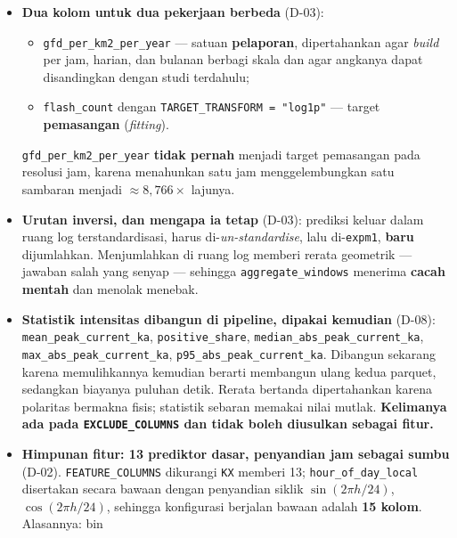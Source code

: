 \begin{itemize}
    \item \textbf{Dua kolom untuk dua pekerjaan berbeda} (D-03):
          \begin{itemize}
              \item \texttt{gfd\_per\_km2\_per\_year} --- satuan
                    \textbf{pelaporan}, dipertahankan agar \textit{build} per
                    jam, harian, dan bulanan berbagi skala dan agar angkanya
                    dapat disandingkan dengan studi terdahulu;
              \item \texttt{flash\_count} dengan
                    \texttt{TARGET\_TRANSFORM = "log1p"} --- target
                    \textbf{pemasangan} (\textit{fitting}).
          \end{itemize}
          \texttt{gfd\_per\_km2\_per\_year} \textbf{tidak pernah} menjadi target
          pemasangan pada resolusi jam, karena menahunkan satu jam menggelembungkan
          satu sambaran menjadi $\approx 8{,}766\times$ lajunya.
    \item \textbf{Urutan inversi, dan mengapa ia tetap} (D-03): prediksi keluar
          dalam ruang log terstandardisasi, harus di-\textit{un-standardise},
          lalu di-\texttt{expm1}, \textbf{baru} dijumlahkan. Menjumlahkan di
          ruang log memberi rerata geometrik --- jawaban salah yang senyap ---
          sehingga \texttt{aggregate\_windows} menerima \textbf{cacah mentah}
          dan menolak menebak.
    \item \textbf{Statistik intensitas dibangun di pipeline, dipakai kemudian}
          (D-08): \texttt{mean\_peak\_current\_ka}, \texttt{positive\_share},
          \texttt{median\_abs\_peak\_current\_ka},
          \texttt{max\_abs\_peak\_current\_ka},
          \texttt{p95\_abs\_peak\_current\_ka}. Dibangun sekarang karena
          memulihkannya kemudian berarti membangun ulang kedua parquet, sedangkan
          biayanya puluhan detik. Rerata bertanda dipertahankan karena polaritas
          bermakna fisis; statistik sebaran memakai nilai mutlak.
          \textbf{Kelimanya ada pada \texttt{EXCLUDE\_COLUMNS} dan tidak boleh
          diusulkan sebagai fitur.}
    \item \textbf{Himpunan fitur: 13 prediktor dasar, penyandian jam sebagai
          sumbu} (D-02). \texttt{FEATURE\_COLUMNS} dikurangi \texttt{KX} memberi
          13; \texttt{hour\_of\_day\_local} disertakan secara bawaan dengan
          penyandian siklik $\sin(2\pi h/24)$, $\cos(2\pi h/24)$, sehingga
          konfigurasi berjalan bawaan adalah \textbf{15 kolom}. Alasannya: bin

\end{itemize}
